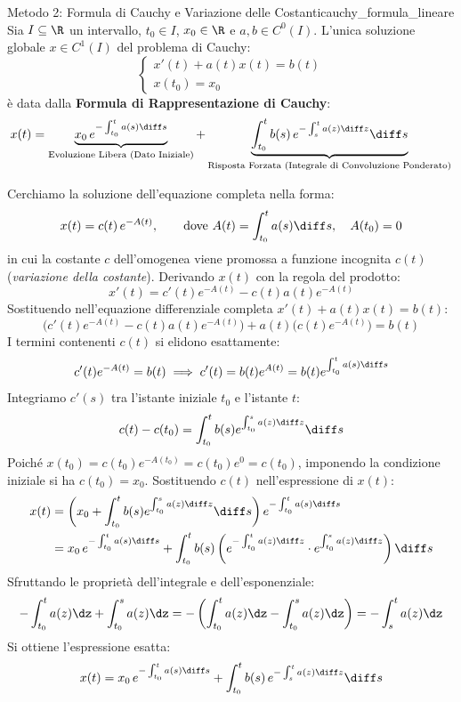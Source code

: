 \begin{teorema}{Metodo 2: Formula di Cauchy e Variazione delle Costanti}{cauchy_formula_lineare}
Sia $I \subseteq \R$ un intervallo, $t_0 \in I$, $x_0 \in \R$ e $a, b \in C^0(I)$. L'unica soluzione globale $x \in C^1(I)$ del problema di Cauchy:
\begin{equation}
    \label{eq:cauchy_1ord_completo}
    \begin{cases}
        x'(t) + a(t) x(t) = b(t) \\
        x(t_0) = x_0
    \end{cases}
\end{equation}
è data dalla \textbf{Formula di Rappresentazione di Cauchy}:
\begin{equation}
    \label{eq:cauchy_formula_chiusa}
    x(t) = \underbrace{x_0\, e^{-\int_{t_0}^t a(s) \diff s}}_{\text{Evoluzione Libera (Dato Iniziale)}} + \underbrace{\int_{t_0}^t b(s)\, e^{-\int_s^t a(z) \diff z} \diff s}_{\text{Risposta Forzata (Integrale di Convoluzione Ponderato)}}
\end{equation}
\end{teorema}

\begin{dimostrazione}
Cerchiamo la soluzione dell'equazione completa nella forma:
\[
    x(t) = c(t)\, e^{-A(t)}, \qquad \text{dove } A(t) = \int_{t_0}^t a(s) \diff s, \quad A(t_0) = 0
\]
in cui la costante $c$ dell'omogenea viene promossa a funzione incognita $c(t)$ (\emph{variazione della costante}).
Derivando $x(t)$ con la regola del prodotto:
\[
    x'(t) = c'(t) e^{-A(t)} - c(t) a(t) e^{-A(t)}
\]
Sostituendo nell'equazione differenziale completa $x'(t) + a(t)x(t) = b(t)$:
\[
    \big( c'(t) e^{-A(t)} - c(t) a(t) e^{-A(t)} \big) + a(t) \big( c(t) e^{-A(t)} \big) = b(t)
\]
I termini contenenti $c(t)$ si elidono esattamente:
\[
    c'(t) e^{-A(t)} = b(t) \implies c'(t) = b(t) e^{A(t)} = b(t) e^{\int_{t_0}^t a(s) \diff s}
\]
Integriamo $c'(s)$ tra l'istante iniziale $t_0$ e l'istante $t$:
\[
    c(t) - c(t_0) = \int_{t_0}^t b(s) e^{\int_{t_0}^s a(z) \diff z} \diff s
\]
Poiché $x(t_0) = c(t_0) e^{-A(t_0)} = c(t_0) e^0 = c(t_0)$, imponendo la condizione iniziale si ha $c(t_0) = x_0$.
Sostituendo $c(t)$ nell'espressione di $x(t)$:
\begin{align*}
    x(t) &= \left( x_0 + \int_{t_0}^t b(s) e^{\int_{t_0}^s a(z) \diff z} \diff s \right) e^{-\int_{t_0}^t a(s) \diff s} \\
    &= x_0\, e^{-\int_{t_0}^t a(s) \diff s} + \int_{t_0}^t b(s) \left( e^{-\int_{t_0}^t a(z) \diff z} \cdot e^{\int_{t_0}^s a(z) \diff z} \right) \diff s
\end{align*}
Sfruttando le proprietà dell'integrale e dell'esponenziale:
\[
    -\int_{t_0}^t a(z)\dz + \int_{t_0}^s a(z)\dz = -\left( \int_{t_0}^t a(z)\dz - \int_{t_0}^s a(z)\dz \right) = -\int_s^t a(z)\dz
\]
Si ottiene l'espressione esatta:
\[
    x(t) = x_0\, e^{-\int_{t_0}^t a(s) \diff s} + \int_{t_0}^t b(s)\, e^{-\int_s^t a(z) \diff z} \diff s
\]
\end{dimostrazione}

